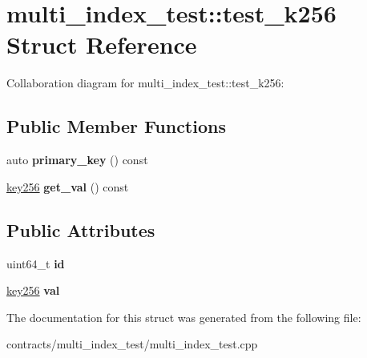 \hypertarget{structmulti__index__test_1_1test__k256}{}\section{multi\+\_\+index\+\_\+test\+:\+:test\+\_\+k256 Struct Reference}
\label{structmulti__index__test_1_1test__k256}


Collaboration diagram for multi\+\_\+index\+\_\+test\+:\+:test\+\_\+k256\+:
\subsection*{Public Member Functions}
\begin{DoxyCompactItemize}
\item 
\mbox{\label{structmulti__index__test_1_1test__k256_a4c287817cb1786bb34642b2eedc52ac0}} 
auto {\bfseries primary\+\_\+key} () const
\item 
\mbox{\label{structmulti__index__test_1_1test__k256_aef7fdd23d4e17150e1c26709bcc9c1d2}} 
\mbox{\hyperlink{classaacio_1_1fixed__key}{key256}} {\bfseries get\+\_\+val} () const
\end{DoxyCompactItemize}
\subsection*{Public Attributes}
\begin{DoxyCompactItemize}
\item 
\mbox{\label{structmulti__index__test_1_1test__k256_a7507b0952729b7fce3e185093960c269}} 
uint64\+\_\+t {\bfseries id}
\item 
\mbox{\label{structmulti__index__test_1_1test__k256_a4f5dec211f3e115a3a9f125e36aa80bf}} 
\mbox{\hyperlink{classaacio_1_1fixed__key}{key256}} {\bfseries val}
\end{DoxyCompactItemize}


The documentation for this struct was generated from the following file\+:\begin{DoxyCompactItemize}
\item 
contracts/multi\+\_\+index\+\_\+test/multi\+\_\+index\+\_\+test.\+cpp\end{DoxyCompactItemize}
